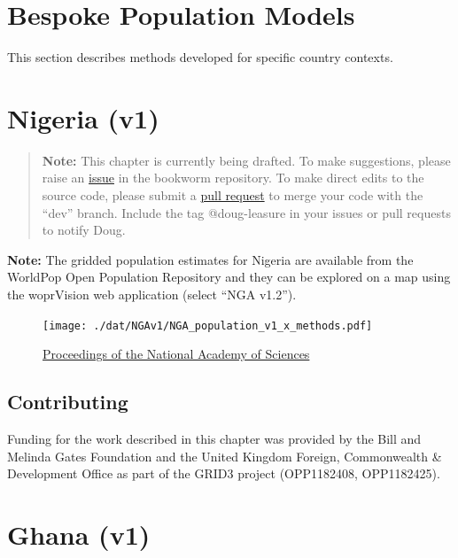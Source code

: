 \documentclass[]{book}
\begin{document}
\chapter*{Bespoke Population Models}\label{bespoke-population-models}

This section describes methods developed for specific country contexts.

\chapter{Nigeria (v1)}\label{nigeria-v1}

\begin{quote}
\textbf{Note:} This chapter is currently being drafted. To make
suggestions, please raise an
\href{https://github.com/wpgp/bookworm/issues}{issue} in the bookworm
repository. To make direct edits to the source code, please submit a
\href{https://github.com/wpgp/bookworm/pulls}{pull request} to merge
your code with the ``dev'' branch. Include the tag @doug-leasure in your
issues or pull requests to notify Doug.
\end{quote}

\textbf{Note:} The gridded population estimates for Nigeria
\citep{worldpop2019bottom-up, worldpop2020bottom-up} are available from
the WorldPop Open Population Repository and they can be explored on a
map using the woprVision web application (select ``NGA v1.2'').

\begin{figure}
\centering
\texttt{[image: ./dat/NGAv1/NGA\_population\_v1\_x\_methods.pdf]}
\caption{\href{https://doi.org/10.1073/pnas.1913050117}{Proceedings of
the National Academy of Sciences} \citep{leasure2020national}}
\end{figure}

\section*{Contributing}\label{contributing-5}

Funding for the work described in this chapter was provided by the Bill
and Melinda Gates Foundation and the United Kingdom Foreign,
Commonwealth \& Development Office as part of the GRID3 project
(OPP1182408, OPP1182425).

\chapter{Ghana (v1)}\label{ghana-v1}
\end{document}

